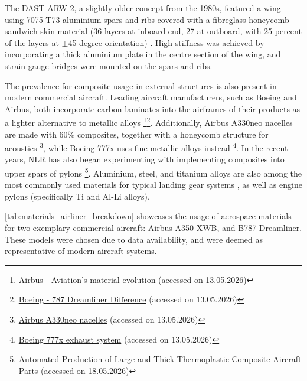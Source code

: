 The DAST ARW-2, a slightly older concept from the 1980s, featured a wing using 7075-T73 aluminium spars and ribs covered with a fibreglass honeycomb sandwich skin material (36 layers at inboard end, 27 at outboard, with 25-percent of the layers at $\pm$45 degree orientation) \cite{Eckstrom1986ARW2}. High stiffness was achieved by incorporating a thick aluminium plate in the centre section of the wing, and strain gauge bridges were mounted on the spars and ribs.

The prevalence for composite usage in external structures is also present in modern commercial aircraft. Leading aircraft manufacturers, such as Boeing and Airbus, both incorporate carbon laminates into the airframes of their products as a lighter alternative to metallic alloys \footnote{\label{url:cfrp_airbus}\href{https://www.airbus.com/en/newsroom/news/2017-02-aviations-material-evolution}{Airbus - Aviation's material evolution} (accessed on 13.05.2026)}\footnote{\label{url:cfrp_boeing}\href{https://www.boeing.com/content/dam/boeing/boeingdotcom/features/innovation-quarterly/2024/IQ-2024-Q3-full.pdf}{Boeing - 787 Dreamliner Difference} (accessed on 13.05.2026)}. Additionally, Airbus A330neo nacelles are made with 60\% composites, together with a honeycomb structure for acoustics \footnote{\href{https://www.safran-group.com/products-services/airbus-a330neo-nacelles}{Airbus A330neo nacelles} (accessed on 13.05.2026)}, while Boeing 777x uses fine metallic alloys instead \footnote{\href{https://www.safran-group.com/products-services/boeing-777x-exhaust-system}{Boeing 777x exhaust system} (accessed on 13.05.2026)}. In the recent years, NLR has also began experimenting with implementing composites into upper spars of pylons    \footnote{\href{https://www.toraytac.com/newsroom/story/HelI/Thermoplastic-Upper-Spar-for-an-Aircraft-Engine-Pylon}{Automated Production of Large and Thick Thermoplastic Composite Aircraft Parts} (accessed on 18.05.2026)}. Aluminium, steel, and titanium alloys are also among the most commonly used materials for typical landing gear systems \cite{typicallandinggear}, as well as engine pylons (specifically Ti and Al-Li alloys)\cite{TiAl_pylon_materials}. 

\autoref{tab:materials_airliner_breakdown} showcases the usage of aerospace materials for two exemplary commercial aircraft: Airbus A350 XWB, and B787 Dreamliner. These models were chosen due to data availability, and were deemed as representative of modern aircraft systems.

